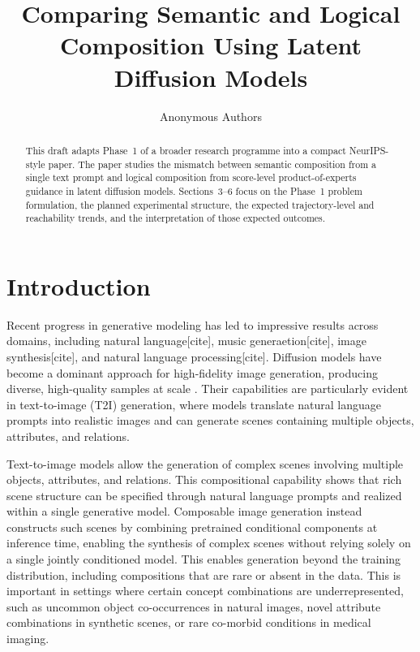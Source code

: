 \documentclass{article}
\title{Comparing Semantic and Logical Composition Using Latent Diffusion Models}
\author{Anonymous Authors}
\begin{document}
\maketitle

\begin{abstract}
This draft adapts Phase~1 of a broader research programme into a compact NeurIPS-style paper. The paper studies the mismatch between semantic composition from a single text prompt and logical composition from score-level product-of-experts guidance in latent diffusion models. Sections~3--6 focus on the Phase~1 problem formulation, the planned experimental structure, the expected trajectory-level and reachability trends, and the interpretation of those expected outcomes.
\end{abstract}

\section{Introduction}

Recent progress in generative modeling has led to impressive results across domains, including natural language[cite], music generaetion[cite], image synthesis[cite], and natural language processing[cite]. 
Diffusion models have become a dominant approach for high-fidelity image generation, producing diverse, high-quality samples at scale \citep{ho2020denoising, dhariwal2021diffusion, rombach2022high, ho2022classifierfree}.
Their capabilities are particularly evident in text-to-image (T2I) generation, where models translate natural language prompts into realistic images and can generate scenes containing multiple objects, attributes, and relations.

Text-to-image models allow the generation of complex scenes involving multiple objects, attributes, and relations. 
This compositional capability shows that rich scene structure can be specified through natural language prompts and realized within a single generative model. 
Composable image generation instead constructs such scenes by combining pretrained conditional components at inference time, enabling the synthesis of complex scenes without relying solely on a single jointly conditioned model.
This enables generation beyond the training distribution, including compositions that are rare or absent in the data. 
This is important in settings where certain concept combinations are underrepresented, such as uncommon object co-occurrences in natural images, novel attribute combinations in synthetic scenes, or rare co-morbid conditions in medical imaging.
\end{document}
